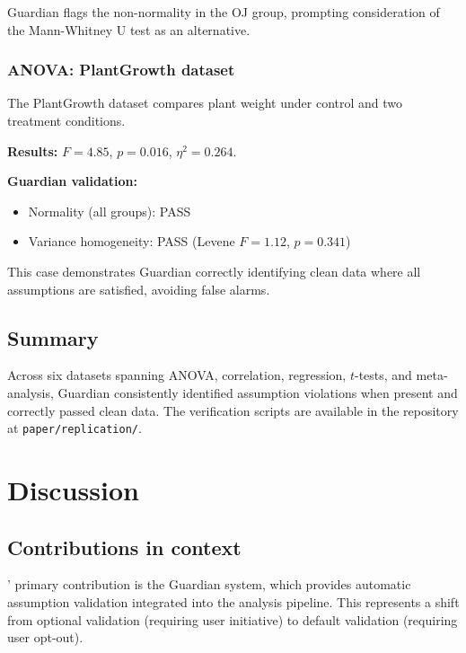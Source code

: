 \documentclass[article]{jss}
\begin{document}
Guardian flags the non-normality in the OJ group, prompting consideration of the Mann-Whitney U test as an alternative.

\subsubsection{ANOVA: PlantGrowth dataset}

The PlantGrowth dataset compares plant weight under control and two treatment conditions.

\textbf{Results:} $F = 4.85$, $p = 0.016$, $\eta^2 = 0.264$.

\textbf{Guardian validation:}
\begin{itemize}
\item Normality (all groups): PASS
\item Variance homogeneity: PASS (Levene $F = 1.12$, $p = 0.341$)
\end{itemize}

This case demonstrates Guardian correctly identifying clean data where all assumptions are satisfied, avoiding false alarms.

\subsection{Summary}

Across six datasets spanning ANOVA, correlation, regression, $t$-tests, and meta-analysis, Guardian consistently identified assumption violations when present and correctly passed clean data. The verification scripts are available in the repository at \texttt{paper/replication/}.


\section{Discussion} \label{sec:discussion}

\subsection{Contributions in context}

' primary contribution is the Guardian system, which provides automatic assumption validation integrated into the analysis pipeline. This represents a shift from optional validation (requiring user initiative) to default validation (requiring user opt-out).
\end{document}
